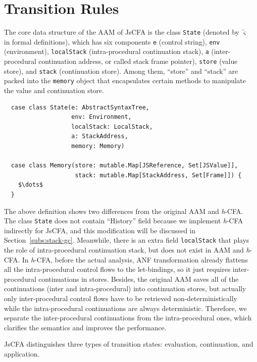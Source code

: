 \documentclass[12pt]{report}
\begin{document}
\section{Transition Rules}
\label{sub:Transition}

The core data structure of the AAM of JsCFA is the class \verb|State| (denoted by $\tilde{\varsigma}$ in formal definitions), which has six components \verb|e| (control string), \verb|env| (environment), \verb|localStack| (intra-procedural continuation stack), \verb|a| (inter-procedural continuation address, or called stack frame pointer), \verb|store| (value store), and \verb|stack| (continuation store). Among them, ``store'' and ``stack'' are packed into the \verb|memory| object that encapsulates certain methods to manipulate the value and continuation store.

\lstset{language=Scala, mathescape}
\begin{lstlisting}
  case class State(e: AbstractSyntaxTree,
                   env: Environment,
                   localStack: LocalStack,
                   a: StackAddress,
                   memory: Memory)

  case class Memory(store: mutable.Map[JSReference, Set[JSValue]],
                    stack: mutable.Map[StackAddress, Set[Frame]]) {
    $\dots$
  }
\end{lstlisting}

The above definition shows two differences from the original AAM and \textit{h}-CFA\@. The class \verb|State| does not contain ``History'' field because we implement \textit{h}-CFA indirectly for JsCFA, and this modification will be discussed in Section~\ref{subs:stack-gc}.
Meanwhile, there is an extra field \verb|localStack| that plays the role of intra-procedural continuation stack, but does not exist in AAM and \textit{h}-CFA. In \textit{h}-CFA, before the actual analysis, ANF transformation already flattens all the intra-procedural control flows to the let-bindings, so it just requires inter-procedural continuations in stores. Besides, the original AAM saves all of the continuations (inter and intra-procedural) into continuation stores, but actually only inter-procedural control flows have to be retrieved non-deterministically while the intra-procedural continuations are always deterministic.
Therefore, we separate the inter-procedural continuations from the intra-procedural ones, which
clarifies the semantics and improves the performance.

JsCFA distinguishes three types of transition states: evaluation, continuation, and application.
\end{document}
